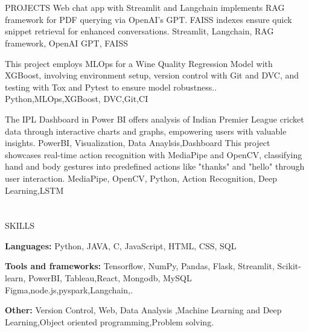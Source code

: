 \documentclass{my_cv}
\begin{document}
\begin{multicols}{2}
\section{\faPaintBrush}{PROJECTS}
%
    {}%
    {Web chat app with Streamlit and Langchain implements RAG framework for PDF querying via OpenAI's GPT. FAISS indexes ensure quick snippet retrieval for enhanced conversations.}%
    {Streamlit, Langchain, RAG framework, OpenAI GPT, FAISS }%
    

%
    {}%
    {This project employs MLOps for a Wine Quality Regression Model with XGBoost, involving environment setup, version control with Git and DVC, and testing with Tox and Pytest to ensure model robustness..}%
    {Python,MLOps,XGBoost, DVC,Git,CI}
     
%
    {}%
    {The IPL Dashboard in Power BI offers analysis of Indian Premier League cricket data through interactive charts and graphs, empowering users with valuable insights.}%
    {PowerBI, Visualization, Data Anaylsis,Dashboard}
%
    {}%
    {This project showcases real-time action recognition with MediaPipe and OpenCV, classifying hand and body gestures into predefined actions like "thanks" and "hello" through user interaction. }
    {MediaPipe, OpenCV, Python, Action Recognition, Deep Learning,LSTM}
    
\section{\faList}{SKILLS}

\textbf{Languages:} Python, JAVA, C, JavaScript, HTML, CSS, SQL

\noindent\textbf{Tools and frameworks:} Tensorflow, NumPy, Pandas, Flask, Streamlit, Scikit-learn, PowerBI, Tableau,React, Mongodb, MySQL Figma,node.js,pyspark,Langchain,.

\noindent\textbf{Other:}  Version Control, Web, Data Analysis ,Machine Learning and Deep Learning,Object oriented programming,Problem solving.

\columnbreak



\end{multicols}
\end{document}

